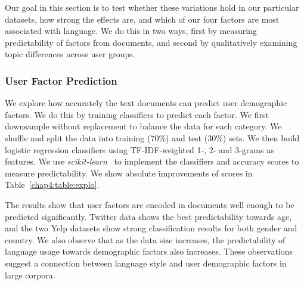 Our goal in this section is to test
whether these variations hold in our particular datasets,
how strong the effects are,
and which of our four factors are most associated with language.
We do this in two ways,
first by measuring predictability of factors from documents,
and second by qualitatively examining topic differences across user groups.


\begin{table}[t]
\centering
{}
\caption{Predictability of user factors from language data. We show absolute percentage of improvements in accuracy over majority-class baselines. For example, the majority-class baselines of accuracy scores are either .500 for the binary prediction or .250 for the region prediction.}
\label{chap4:table:explo}
\end{table}

\subsubsection{User Factor Prediction}

We explore how accurately the text documents can predict user demographic factors. 
We do this by training classifiers to predict each factor.
We first downsample without replacement to balance the data for each category. We shuffle and split the data into training (70\%) and test (30\%) sets. 
We then build logistic regression classifiers using TF-IDF-weighted 1-, 2- and 3-grams as features. 
We use \textit{scikit-learn}~\cite{pedregosa2011scikit} to implement the classifiers and accuracy scores to measure predictability.
We show absolute improvements of scores in Table~\ref{chap4:table:explo}. 

The results show that user factors are encoded in documents well enough to be predicted significantly.
Twitter data shows the best predictability towards age, and the two Yelp datasets show strong classification results for both gender and country. We also observe that as the data size increases, the predictability of language usage towards demographic factors also increases. These observations suggest a connection between language style and user demographic factors in large corpora.


